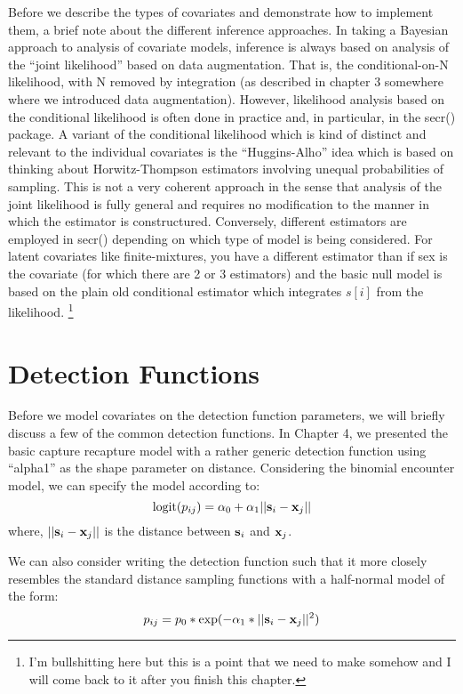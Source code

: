 Before we  describe the types of covariates and demonstrate how to implement them, a brief note about the different inference approaches. In taking a Bayesian approach to analysis of covariate models, inference is always based on analysis of the ``joint likelihood'' based on data augmentation. That is, the conditional-on-N likelihood, with N removed by integration (as described in chapter 3 somewhere where we introduced data augmentation). However, likelihood analysis based on the conditional likelihood is often done in practice and, in particular, in the secr() package.  A variant of the conditional likelihood which is kind of distinct and relevant to the individual covariates is the ``Huggins-Alho'' idea which is based on thinking about Horwitz-Thompson estimators involving unequal probabilities of sampling.  This is not a very coherent approach in the sense that analysis of the joint likelihood is fully general and requires no modification to the manner in which the estimator is constructured. Conversely, different estimators are employed in secr() depending on which type of model is being considered. For latent covariates like finite-mixtures, you have a different estimator than if sex is the covariate (for which there are 2 or 3 estimators) and the basic null model is based on the plain old conditional estimator which integrates $s[i]$ from the likelihood. \footnote{ I'm bullshitting here but this is a point that we need to make somehow and I will come back to it after you finish this chapter.}

\section{Detection Functions}

Before we model covariates on the detection function parameters, we will briefly discuss a few of the common detection functions.  In Chapter 4, we presented the basic capture recapture model with a rather generic detection function using ``alpha1'' as the shape parameter on distance.   Considering the binomial encounter model, we can specify the model according to:
\begin{equation}
	\mbox{logit}(p_{ij}) = \alpha_{0} + \alpha_1 ||{\bf s}_{i}-{\bf x}_{j} ||
\label{scr0.eq.logit}
\end{equation}
where, $||{\bf s}_{i}-{\bf x}_{j}||$ is the distance between ${\bf s}_{i}$ and ${\bf x}_{j}$. 

We can also consider writing the detection function such that it more closely resembles the standard distance sampling functions with a half-normal model of the form:
\[
p_{ij} = p_{0}*\exp(-\alpha_{1} *||{\bf s}_{i}-{\bf x}_{j}||^2)
\]

